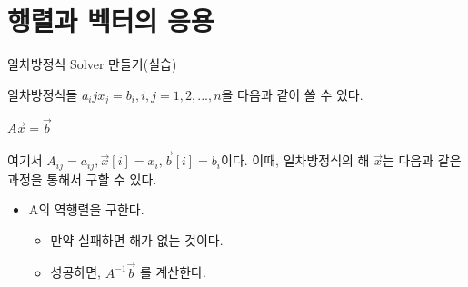 \documentclass{beamer}
\begin{document}




\section{행렬과 벡터의 응용} 





\begin{frame}{일차방정식 Solver 만들기(실습)} 

일차방정식들 $a_ijx_j = b_i, i,j = 1,2,...,n$을 다음과 같이 쓸 수 있다. 

$A\vec{x} = \vec{b}$

여기서 $A_{ij} = a_{ij}, \vec{x}[i] = x_i, \vec{b}[i] = b_i$이다. 이때, 일차방정식의 해 $\vec{x}$는 다음과 같은 과정을 통해서 구할 수 있다. 

\begin{itemize} 
\item A의 역행렬을 구한다. 
\begin{itemize} 
\item 만약 실패하면 해가 없는 것이다. 
\item 성공하면, $A^{-1} \vec{b}$ 를 계산한다. 
\end{itemize}
\end{itemize}
\end{frame}





\end{document}
